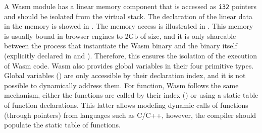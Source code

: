\begin{code}
    \begin{minipage}[t]{0.4\linewidth}

\end{minipage}\hspace{20mm}
\begin{minipage}[t]{0.4\linewidth}

%

\end{minipage}


\end{code}

A Wasm module has a linear memory component that is accessed as \texttt{i32} pointers and should be isolated from the virtual stack. The declaration of the linear data in the memory is showed in . The memory access is illustrated in . This memory is usually bound in browser engines to 2Gb of size, and it is only shareable between the process that instantiate the Wasm binary and the binary itself (explicitly declared in  and ). Therefore, this ensures the isolation of the execution of Wasm code. Wasm also provides global variables in their four primitive types. Global variables () are only accessible by their declaration index, and it is not possible to dynamically address them. For function, Wasm follows the same mechanism, either the functions are called by their index () or using a static table of function declarations. This latter allows modeling dynamic calls of functions (through pointers) from languages such as C/C++, however, the compiler should populate the static table of functions.


